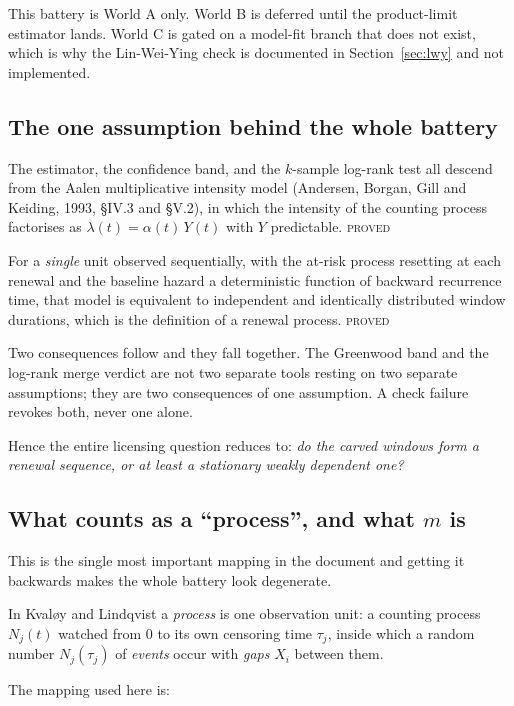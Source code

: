 \documentclass[11pt,a4paper]{article}
\newcommand{\PROVED}{\textsc{\textcolor{blue!55!black}{proved}}}
\begin{document}
\medskip
\noindent
This battery is World A only. World B is deferred until the product-limit estimator
lands. World C is gated on a model-fit branch that does not exist, which is why the
Lin-Wei-Ying check is documented in Section~\ref{sec:lwy} and not implemented.

\subsection{The one assumption behind the whole battery}

The estimator, the confidence band, and the $k$-sample log-rank test all descend from
the Aalen multiplicative intensity model (Andersen, Borgan, Gill and Keiding, 1993,
\S IV.3 and \S V.2), in which the intensity of the counting process factorises as
$\lambda(t) = \alpha(t)\,Y(t)$ with $Y$ predictable. \PROVED

For a \emph{single} unit observed sequentially, with the at-risk process resetting at
each renewal and the baseline hazard a deterministic function of backward recurrence
time, that model is equivalent to independent and identically distributed window
durations, which is the definition of a renewal process. \PROVED

Two consequences follow and they fall together. The Greenwood band and the log-rank
merge verdict are not two separate tools resting on two separate assumptions; they are
two consequences of one assumption. A check failure revokes both, never one alone.

Hence the entire licensing question reduces to: \emph{do the carved windows form a
renewal sequence, or at least a stationary weakly dependent one?}

\subsection{What counts as a \enquote{process}, and what \texorpdfstring{$m$}{m} is}
\label{sec:whatism}

This is the single most important mapping in the document and getting it backwards makes
the whole battery look degenerate.

In Kvaløy and Lindqvist a \emph{process} is one observation unit: a counting process
$N_j(t)$ watched from $0$ to its own censoring time $\tau_j$, inside which a random
number $N_j(\tau_j)$ of \emph{events} occur with \emph{gaps} $X_i$ between them.

The mapping used here is:
\end{document}
